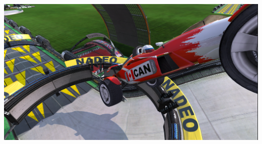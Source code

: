 \documentclass[
  oneside,
  open=any]{scrreprt}
\begin{document}
\begin{titlepage}
\newcommand{\titleblock}{\newlength{\betweentitlesubtitle}
\setlength{\betweentitlesubtitle}{\baselineskip}
{

{\titlepagetitleblock}
}

\vspace{0.1\textheight}
}

\newcommand{\authorblock}{}

\newcommand{\affiliationblock}{}

\newcommand{\logoblock}{{\includegraphics[width=0.7\textheight]{img/car-jump.png}}

\vspace{1cm}
}

\newcommand{\footerblock}{{\titlepagefooterblock}

\vspace{0pt}
}

\newcommand{\dateblock}{}

\newcommand{\headerblock}{}

\thispagestyle{empty} %


\newlength{\minipagewidth}
\setlength{\minipagewidth}{\textwidth}
\raggedright %
\begin{minipage}[b][\textheight][s]{\minipagewidth}
\titlepagepagealign
\titleblock

\authorblock

\logoblock

\footerblock
\par

\end{minipage}
\clearpage
\end{titlepage}
\setcounter{page}{1}
\end{document}
